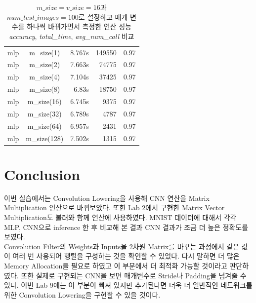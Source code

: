 \documentclass{article}
\begin{document}
\begin{table}[htb!]
\begin{center}
\begin{tabular}{ |c | c | rrr |}
 \hline
mlp & m\_size(1) & 8.767s & 149550 & 0.97 \\
mlp & m\_size(2) & 7.663s & 74775 & 0.97 \\
mlp & m\_size(4) & 7.104s & 37425 & 0.97 \\
mlp & m\_size(8) & 6.83s & 18750 & 0.97 \\
mlp & m\_size(16) & 6.745s & 9375 & 0.97 \\
mlp & m\_size(32) & 6.789s & 4787 & 0.97 \\
mlp & m\_size(64) & 6.957s & 2431 & 0.97 \\
mlp & m\_size(128) & 7.502s & 1315 & 0.97 \\
 \hline
\end{tabular}
\caption{ $\textit{m\_size}=\textit{v\_size}=16$과 $\textit{num\_test\_images}=100$로 설정하고 매개 변수를 하나씩 바꿔가면서 측정한 연산 성능 \textit{accuracy}, \textit{total\_time}, \textit{avg\_num\_call} 비교}\label{tab1}
\end{center}
\end{table}

\newpage
\section{Conclusion}
이번 실습에서는 Convolution Lowering을 사용해 CNN 연산을 Matrix Multiplication 연산으로 바꿔보았다. 또한 Lab 2에서 구현한 Matrix Vector Multiplication도 불러와 함께 연산에 사용하였다. MNIST 데이터에 대해서 각각 MLP, CNN으로 inference 한 후 비교해 본 결과 CNN 결과가 조금 더 높은 정확도를 보였다. \\

Convolution Filter의 Weights과 Inputs을 2차원 Matrix를 바꾸는 과정에서 같은 값이 여러 번 사용되어 행렬을 구성하는 것을 확인할 수 있었다. 다시 말하면 더 많은 Memory Allocation을 필요로 하였고 이 부분에서 더 최적화 가능할 것이라고 판단하였다. 또한 실제로 구현되는 CNN을 보면 매개변수로 Stride나 Padding을 넘겨줄 수 있다. 이번 Lab 9에는 이 부분이 빠져 있지만 추가된다면 더욱 더 일반적인 네트워크를 위한 Convolution Lowering을 구현할 수 있을 것이다. \\



\end{document}

